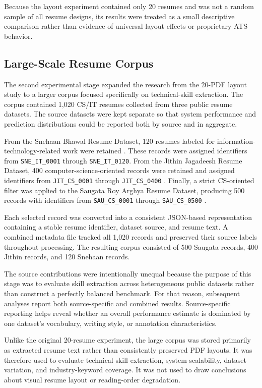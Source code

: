 \documentclass[conference]{IEEEtran}
\begin{document}
Because the layout experiment contained only 20 resumes and was not a
random sample of all resume designs, its results were treated as a
small descriptive comparison rather than evidence of universal
layout effects or proprietary ATS behavior.

\subsection{Large-Scale Resume Corpus}

The second experimental stage expanded the research from the
20-PDF layout study to a larger corpus focused specifically on
technical-skill extraction. The corpus contained 1,020 CS/IT resumes
collected from three public resume datasets. The source datasets were
kept separate so that system performance and prediction distributions
could be reported both by source and in aggregate.

From the Snehaan Bhawal Resume Dataset, 120 resumes labeled for
information-technology-related work were retained
\cite{snehaan_dataset}. These records were assigned identifiers from
\texttt{SNE\_IT\_0001} through \texttt{SNE\_IT\_0120}. From the
Jithin Jagadeesh Resume Dataset, 400 computer-science-oriented records
were retained and assigned identifiers from
\texttt{JIT\_CS\_0001} through \texttt{JIT\_CS\_0400}
\cite{jithin_dataset}. Finally, a strict CS-oriented filter was applied
to the Saugata Roy Arghya Resume Dataset, producing 500 records with
identifiers from \texttt{SAU\_CS\_0001} through
\texttt{SAU\_CS\_0500} \cite{saugata_dataset}.

Each selected record was converted into a consistent JSON-based
representation containing a stable resume identifier, dataset source,
and resume text. A combined metadata file tracked all 1,020 records and
preserved their source labels throughout processing. The resulting
corpus consisted of 500 Saugata records, 400 Jithin records, and 120
Snehaan records.

The source contributions were intentionally unequal because the purpose
of this stage was to evaluate skill extraction across heterogeneous
public datasets rather than construct a perfectly balanced benchmark.
For that reason, subsequent analyses report both source-specific and
combined results. Source-specific reporting helps reveal whether an
overall performance estimate is dominated by one dataset's vocabulary,
writing style, or annotation characteristics.

Unlike the original 20-resume experiment, the large corpus was stored
primarily as extracted resume text rather than consistently preserved
PDF layouts. It was therefore used to evaluate technical-skill
extraction, system scalability, dataset variation, and industry-keyword
coverage. It was not used to draw conclusions about visual resume
layout or reading-order degradation.
\end{document}
